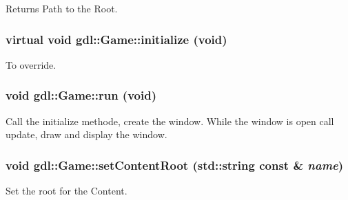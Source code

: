 \begin{DoxyReturn}{Returns}
Path to the Root. 
\end{DoxyReturn}
\hypertarget{classgdl_1_1Game_a91948cfa194675d33b82c90eace878b2}{
\subsubsection[{initialize}]{\setlength{\rightskip}{0pt plus 5cm}virtual void gdl::Game::initialize (void)}}
\label{classgdl_1_1Game_a91948cfa194675d33b82c90eace878b2}
To override. \hypertarget{classgdl_1_1Game_aba4bb3b2f086d131a81ebe3de997938a}{
\subsubsection[{run}]{\setlength{\rightskip}{0pt plus 5cm}void gdl::Game::run (void)}}
\label{classgdl_1_1Game_aba4bb3b2f086d131a81ebe3de997938a}
Call the initialize methode, create the window. While the window is open call update, draw and display the window. \hypertarget{classgdl_1_1Game_a42bb8fd2de5376f6c864a998690da48d}{
\subsubsection[{setContentRoot}]{\setlength{\rightskip}{0pt plus 5cm}void gdl::Game::setContentRoot (std::string const \& {\em name})}}
\label{classgdl_1_1Game_a42bb8fd2de5376f6c864a998690da48d}
Set the root for the Content.


